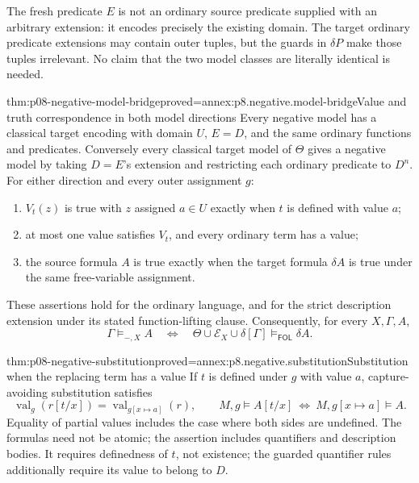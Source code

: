 The fresh predicate \(E\) is not an ordinary source predicate supplied with
an arbitrary extension: it encodes precisely the existing domain.  The target
ordinary predicate extensions may contain outer tuples, but the guards in
\(\delta P\) make those tuples irrelevant.  No claim that the two model
classes are literally identical is needed.

\begin{hbtheorem}{thm:p08-negative-model-bridge}{proved=annex:p8.negative.model-bridge}{Value and truth correspondence in both model directions}
Every negative model has a classical target encoding with domain \(U\),
\(E=D\), and the same ordinary functions and predicates.  Conversely every
classical target model of \(\Theta\) gives a negative model by taking
\(D=E\)'s extension and restricting each ordinary predicate to \(D^n\).
For either direction and every outer assignment \(g\):
\begin{enumerate}
\item \(V_t(z)\) is true with \(z\) assigned \(a\in U\) exactly when
      \(t\) is defined with value \(a\);
\item at most one value satisfies \(V_t\), and every ordinary term has a
      value;
\item the source formula \(A\) is true exactly when the target formula
      \(\delta A\) is true under the same free-variable assignment.
\end{enumerate}
These assertions hold for the ordinary language, and for the strict
description extension under its stated function-lifting clause.
Consequently, for every \(X,\Gamma,A\),
\[
 \Gamma\models_{-,X}A
 \quad\Longleftrightarrow\quad
 \Theta\cup\mathcal E_X\cup\delta[\Gamma]
                         \models_{\mathsf{FOL}}\delta A.
\]
\end{hbtheorem}

\begin{hblemma}{thm:p08-negative-substitution}{proved=annex:p8.negative.substitution}{Substitution when the replacing term has a value}
If \(t\) is defined under \(g\) with value \(a\), capture-avoiding
substitution satisfies
\[
 \operatorname{val}_g(r[t/x])=
       \operatorname{val}_{g[x\mapsto a]}(r),\qquad
 M,g\models A[t/x]\ \Longleftrightarrow\ M,g[x\mapsto a]\models A.
\]
Equality of partial values includes the case where both sides are undefined.
The formulas need not be atomic; the assertion includes quantifiers and
description bodies.  It requires definedness of \(t\), not existence; the
guarded quantifier rules additionally require its value to belong to \(D\).
\end{hblemma}

